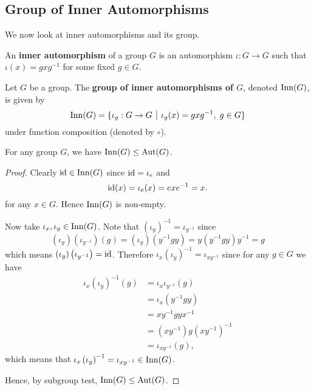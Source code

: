 \subsection{Group of Inner Automorphisms}
We now look at inner automorphisms and its group.
\begin{definition}
    An \textbf{inner automorphism} of a group $G$ is an automorphism $\iota: G \to G$ such that $\iota(x) = gxg^{-1}$ for some fixed $g \in G$.
\end{definition}
\begin{definition}
    Let $G$ be a group. The \textbf{group of inner automorphisms of $G$}, denoted $\mathrm{Inn}(G)$, is given by
    \[
        \Inn{G} = \{\iota_g: G \to G \vert \iota_g(x) = gxg^{-1},\; g \in G\}
    \]
    under function composition (denoted by $\circ$).
\end{definition}

\begin{proposition}
    For any group $G$, we have $\mathrm{Inn}(G) \leq \mathrm{Aut}(G)$.
\end{proposition}
\begin{proof}
    Clearly $\mathrm{id} \in \mathrm{Inn}(G)$ since $\mathrm{id} = \iota_e$ and
    \[
        \mathrm{id}(x) = \iota_e(x) = exe^{-1} = x.
    \]
    for any $x \in G$. Hence $\mathrm{Inn}(G)$ is non-empty.

    Now take $\iota_x, \iota_y \in \mathrm{Inn}(G)$. Note that $\left(\iota_y\right)^{-1} = \iota_{y^{-1}}$ since
    \[
        \left(\iota_y\right)\left(\iota_{y^{-1}}\right)(g) = \left(\iota_y\right)\left(y^{-1}gy\right) = y\left(y^{-1}gy\right)y^{-1} = g
    \]
    which means $\left(\iota_y\right)\left(\iota_{y^{-1}}\right) = \mathrm{id}$. Therefore $\iota_x\left(\iota_y\right)^{-1} = \iota_{xy^{-1}}$ since for any $g \in G$ we have
    \begin{align*}
        \iota_x\left(\iota_y\right)^{-1}(g) &= \iota_x\iota_{y^{-1}}(g)\\
        &= \iota_x\left(y^{-1}gy\right)\\
        &= xy^{-1}gyx^{-1}\\
        &= \left(xy^{-1}\right) g \left(xy^{-1}\right)^{-1}\\
        &= \iota_{xy^{-1}}(g),
    \end{align*}
    which means that $\iota_x\left(\iota_y\right)^{-1} = \iota_{xy^{-1}} \in \mathrm{Inn}(G)$.

    Hence, by subgroup test, $\mathrm{Inn}(G) \leq \mathrm{Aut}(G)$.
\end{proof}

